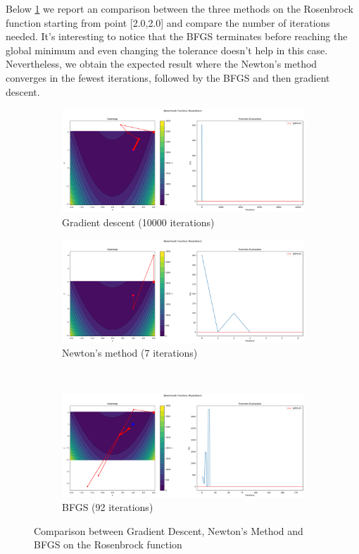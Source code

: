 Below \ref{fig:ros-comparison} we report an comparison between the three methods on the Rosenbrock function starting from point [2.0,2.0] and compare the number of iterations needed. It's interesting to notice that the BFGS terminates before reaching the global minimum and even changing the tolerance doesn't help in this case. Nevertheless, we obtain the expected result where the Newton's method converges in the fewest iterations, followed by the BFGS and then gradient descent.
\begin{figure}[H]
    \begin{subfigure}{0.5\linewidth}
        \includegraphics[width=\linewidth]{lab3/imgs/gd_rosenbrock.png}
        \caption{Gradient descent (10000 iterations)}
    \end{subfigure}
    \begin{subfigure}{0.5\linewidth}
        \includegraphics[width=\linewidth]{lab3/imgs/nm_rosenbrock.png}
        \caption{Newton's method (7 iterations)}
    \end{subfigure} \\
    \begin{subfigure}{\linewidth}
        \centering
        \includegraphics[width=0.5\linewidth]{lab3/imgs/bfgs_rosenbrock.png}
        \caption{BFGS (92 iterations)}
    \end{subfigure}
    \caption{Comparison between Gradient Descent, Newton's Method and BFGS on the Rosenbrock function}
    \label{fig:ros-comparison}
\end{figure}
